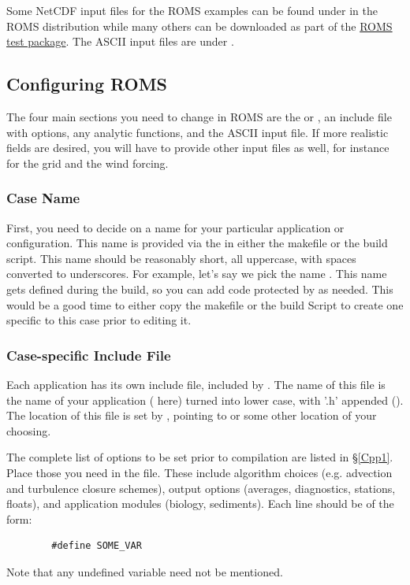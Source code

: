 Some NetCDF input files for the ROMS examples can be found under
 in the ROMS distribution while many others can be
downloaded as part of the \href{http://www.myroms.org/svn/src/test}{ROMS
test package}. The ASCII input files are under .

\subsection{Configuring ROMS}
\label{User}

The four main sections you need to change in ROMS are the 
or , an include file with  options, any
analytic functions, and the ASCII input file. If more realistic fields
are desired, you will have to provide other input files as well, for
instance for the grid and the wind forcing.

\subsubsection{Case Name}

First, you need to decide on a name for your particular application or
configuration. This name is provided via the  in
either the makefile or the build script. This name should be reasonably
short, all uppercase, with spaces converted to underscores. For example,
let's say we pick the name . This name gets defined
during the build, so you can add code protected by  as needed. This would be a good time to either copy the
makefile or the build Script to create one specific to this case prior
to editing it.

\subsubsection{ Case-specific Include File}

Each application has its own include file, included by
. The name of this file is the name of your
application ( here) turned into lower case, with '.h'
appended (). The location of this file is set by
, pointing to  or some other
location of your choosing.

The complete list of options to be set prior to compilation are listed in
\S\ref{Cpp1}. Place those you need in the  file. These
include algorithm choices (e.g. advection and turbulence closure schemes),
output options (averages, diagnostics, stations, floats), and
application modules (biology, sediments). Each line should be of the
form:
\begin{verbatim}
        #define SOME_VAR
\end{verbatim}
Note that any undefined variable need not be mentioned.

